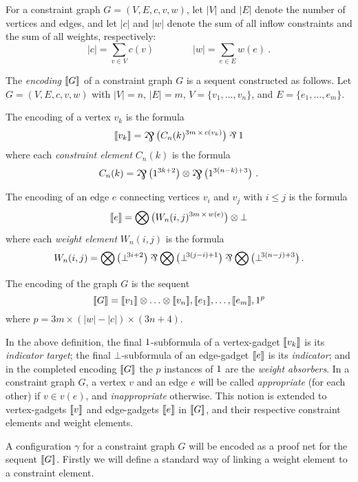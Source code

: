 \documentclass{lmcs}
\begin{document}
For a constraint graph $G=(V,E,c,v,w)$, let $|V|$ and $|E|$ denote the number of vertices and edges, and let $|c|$ and $|w|$ denote the sum of all inflow constraints and the sum of all weights, respectively:
\[
	|c| = \sum_{v\in V}c(v) \qquad\qquad |w| = \sum_{e\in E}w(e)~.
\]


\begin{definition}
\label{def:graph encoding}
The \emph{encoding} $\llbracket G\rrbracket$ of a constraint graph $G$ is a sequent constructed as follows. 
Let $G=(V,E,c,v,w)$ with $|V|=n$, $|E|=m$, $V=\{v_1,\dotsc,v_n\}$, and $E=\{e_1,\dotsc,e_m\}$.

\noindent
The encoding of a vertex $v_k$ is the formula
\[
	\itn{v_k} = \bigparr\big(C_n(k)^{3m\,\times\,c(v_k)} \big)\pr\1
\]
where each \emph{constraint element} $C_n(k)$ is the formula
\[
	C_n(k) = \bigparr\big(1^{3k+2}\big) \tn \bigparr\big(1^{3(n-k)+3}\big)~.
\]

\noindent
The encoding of an edge $e$ connecting vertices $v_i$ and $v_j$ with $i\leq j$ is the formula
\[
	\llbracket e\rrbracket = \bigotimes\big(W_n(i,j)^{3m\,\times\,w(e)}\big)\otimes\bot
\]
where each \emph{weight element} $W_n(i,j)$ is the formula
\[
	W_n(i,j) = \bigtn\big(\bot\!^{3i+2}\big)\pr\bigtn\big(\bot\!^{3(j-i)+1}\big)\pr\bigtn\big(\bot\!^{3(n-j)+3}\big)\,.
\]

\noindent
The encoding of the graph $G$ is the sequent
\[
	\llbracket G\rrbracket = \llbracket v_1\rrbracket\otimes\dotso\otimes\llbracket v_n\rrbracket, \llbracket e_1\rrbracket,\dotsc,\llbracket e_m\rrbracket, 1^p
\]
where $p=3m\times(|w|-|c|)\times(3n+4)$.

\end{definition}



In the above definition, the final $1$-subformula of a vertex-gadget $\llbracket v_k\rrbracket$ is its \emph{indicator target}; the final $\bot$-subformula of an edge-gadget $\llbracket e\rrbracket$ is its \emph{indicator}; and in the completed encoding $\llbracket G\rrbracket$ the $p$ instances of $1$ are the \emph{weight absorbers}.
%
In a constraint graph $G$, a vertex $v$ and an edge $e$ will be called \emph{appropriate} (for each other) if $v\in v(e)$, and \emph{inappropriate} otherwise.
%
This notion is extended to vertex-gadgets $\llbracket v\rrbracket$ and edge-gadgets $\llbracket e\rrbracket$ in $\llbracket G\rrbracket$, and their respective constraint elements and weight elements.



A configuration $\gamma$ for a constraint graph $G$ will be encoded as a proof net for the sequent $\llbracket G\rrbracket$.
%
Firstly we will define a standard way of linking a weight element to a constraint element.
\end{document}
